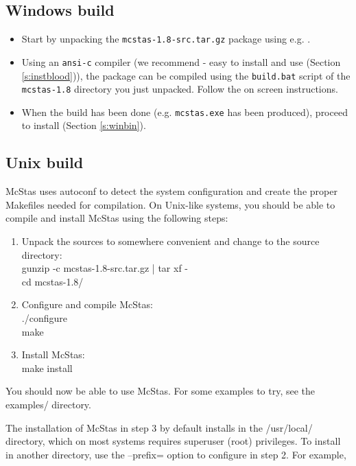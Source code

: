 \subsection{Windows build}
\begin{itemize}
\item{Start by unpacking the \texttt{mcstas-1.8-src.tar.gz} package using
e.g. .}
\item{Using an \texttt{ansi-c} compiler (we recommend
 - easy to install
and use (Section \ref{s:instblood})), the
 package can be
compiled using the \texttt{build.bat} script of the
\texttt{mcstas-1.8} directory you just unpacked. Follow the on screen
instructions.} 
\item{When the build has been done (e.g. \texttt{mcstas.exe}
has been produced), proceed to install (Section \ref{s:winbin}).}
\end{itemize}

\subsection{Unix build}
McStas uses autoconf to detect the system configuration and create the
proper Makefiles needed for compilation. On Unix-like systems, you
should be able to compile and install McStas using the following steps:
\begin{enumerate}
\item{Unpack the sources to somewhere convenient and change to the
    source directory:\\
  gunzip -c mcstas-1.8-src.tar.gz | tar xf -\\
  cd mcstas-1.8/}
\item{Configure and compile McStas:\\
  ./configure\\
  make}
\item{Install McStas:\\
  make install}
\end{enumerate}

\noindent You should now be able to use McStas. For some examples to try, see the
examples/ directory.

\noindent The installation of McStas in step 3 by default installs in the
/usr/local/ directory, which on most systems requires superuser (root)
privileges. To install in another directory, use the --prefix= option to
configure in step 2. For example,\\

